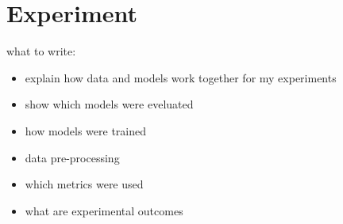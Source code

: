 \section{Experiment}

\bigbreak
what to write:
\begin{itemize}
  \item explain how data and models work together for my experiments
  \item show which models were eveluated
  \item how models were trained
  \item data pre-processing
  \item which metrics were used
  \item what are experimental outcomes
\end{itemize}
